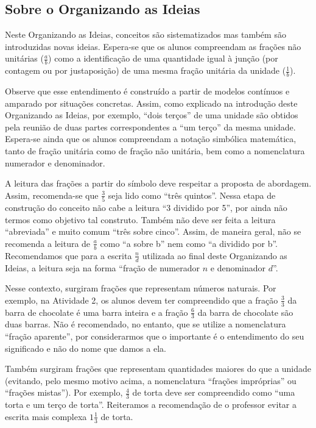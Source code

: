 \subsection{Sobre o Organizando as Ideias}



Neste Organizando as Ideias, conceitos são  sistematizados mas também são introduzidas novas ideias. Espera-se que os alunos compreendam as frações não unitárias ($\frac{a}{b}$) como a identificação de uma quantidade igual à junção (por contagem ou por justaposição) de uma mesma fração unitária da unidade ($\frac{1}{b}$). 

Observe que esse entendimento é construído a partir de modelos contínuos e amparado por situações concretas. Assim, como explicado na introdução deste Organizando as Ideias, por exemplo, ``dois terços'' de uma unidade são obtidos pela reunião de duas partes correspondentes a ``um terço'' da mesma unidade.
Espera-se ainda que os alunos compreendam a notação simbólica matemática, tanto de fração unitária como de fração não unitária, bem como a nomenclatura numerador e denominador. 

A leitura das frações a partir do símbolo deve respeitar a proposta de abordagem. Assim, recomenda-se que $\frac{3}{5}$ seja lido como ``três quintos''. Nessa etapa de construção do conceito não cabe a leitura ``3 dividido por 5'', por ainda não termos como objetivo tal construto.
Também não deve ser feita a leitura ``abreviada'' e muito comum ``três sobre cinco''. Assim, de maneira geral, não se recomenda a leitura de $\frac{a}{b}$ como ``a sobre b'' nem como ``a dividido por b''.
Recomendamos que para a escrita $\frac{n}{d}$ utilizada ao final deste Organizando as Ideias, a leitura seja na forma ``fração de numerador $n$ e denominador $d$''.

Nesse contexto, surgiram frações que representam números naturais. Por exemplo, na Atividade 2, os alunos devem ter compreendido que a fração $\frac{3}{3}$ da barra de chocolate é uma barra inteira e a fração $\frac{6}{3}$ da barra de chocolate são duas barras. Não é recomendado, no entanto, que se utilize a nomenclatura ``fração aparente'', por considerarmos que o importante é o entendimento do seu significado e não do nome que damos a ela.

Também surgiram frações que representam quantidades maiores do que a unidade (evitando, pelo mesmo motivo acima, a nomenclatura ``frações impróprias'' ou ``frações mistas''). Por exemplo, $\frac{4}{3}$ de torta deve ser compreendido como ``uma torta e um terço de torta''. Reiteramos a recomendação de o professor evitar a escrita mais complexa $1 \frac{1}{3}$ de torta.

